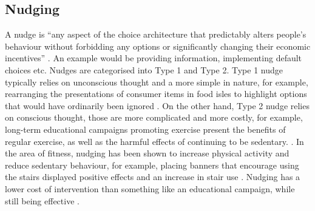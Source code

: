 \subsection{Nudging}
A nudge is “any aspect of the choice architecture that predictably alters people's behaviour without forbidding any options or significantly changing their economic incentives” \cite{nudgeDef}. An example would be providing information, implementing default choices etc. Nudges are categorised into Type 1 and Type 2. Type 1 nudge typically relies on unconscious thought and a more simple in nature, for example, rearranging the presentations of consumer items in food isles to highlight options that would have ordinarily been ignored \cite{NudgeCritical}. On the other hand, Type 2 nudge relies on conscious thought, those are more complicated and more costly, for example, long-term educational campaigns promoting exercise present the benefits of regular exercise, as well as the harmful effects of continuing to be sedentary. \cite{NudgeCritical}.  In the area of fitness, nudging has been shown to increase physical activity and reduce sedentary behaviour, for example, placing banners that encourage using the stairs displayed positive effects and an increase in stair use \cite{FORBERGER2022106922, Forberger2019}. Nudging has a lower cost of intervention than something like an educational campaign, while still being effective \cite{nudgeCost}. 

